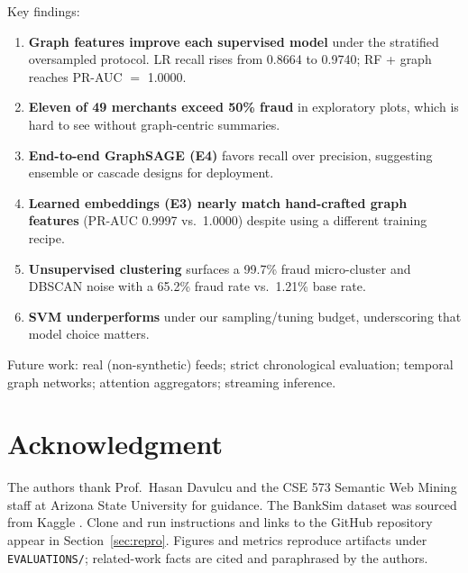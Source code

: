 \documentclass[conference]{IEEEtran}
\begin{document}
Key findings:
\begin{enumerate}
    \item \textbf{Graph features improve each supervised model} under the stratified oversampled protocol. LR recall rises from 0.8664 to 0.9740; RF + graph reaches PR-AUC $=$ 1.0000.
    \item \textbf{Eleven of 49 merchants exceed 50\% fraud} in exploratory plots, which is hard to see without graph-centric summaries.
    \item \textbf{End-to-end GraphSAGE (E4)} favors recall over precision, suggesting ensemble or cascade designs for deployment.
    \item \textbf{Learned embeddings (E3) nearly match hand-crafted graph features} (PR-AUC 0.9997 vs.\ 1.0000) despite using a different training recipe.
    \item \textbf{Unsupervised clustering} surfaces a 99.7\% fraud micro-cluster and DBSCAN noise with a 65.2\% fraud rate vs.\ 1.21\% base rate.
    \item \textbf{SVM underperforms} under our sampling/tuning budget, underscoring that model choice matters.
\end{enumerate}

Future work: real (non-synthetic) feeds; strict chronological evaluation; temporal graph networks; attention aggregators; streaming inference.

\section*{Acknowledgment}
The authors thank Prof.\ Hasan Davulcu and the CSE 573 Semantic Web Mining staff at Arizona State University for guidance. The BankSim dataset was sourced from Kaggle \cite{b1}. Clone and run instructions and links to the GitHub repository appear in Section~\ref{sec:repro}. Figures and metrics reproduce artifacts under \texttt{EVALUATIONS/}; related-work facts are cited and paraphrased by the authors.
\end{document}
